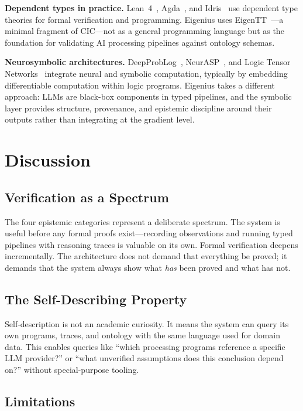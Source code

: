 \documentclass[10pt,twocolumn,letterpaper]{article}
\begin{document}
\textbf{Dependent types in practice.}
Lean~4~\cite{lean4}, Agda~\cite{agda}, and Idris~\cite{idris} use dependent type theories for formal verification and programming.
Eigenius uses EigenTT~\cite{minitt}---a minimal fragment of CIC---not as a general programming language but as the foundation for validating AI processing pipelines against ontology schemas.

\textbf{Neurosymbolic architectures.}
DeepProbLog~\cite{deepproblog}, NeurASP~\cite{neurasp}, and Logic Tensor Networks~\cite{ltn} integrate neural and symbolic computation, typically by embedding differentiable computation within logic programs.
Eigenius takes a different approach: LLMs are black-box components in typed pipelines, and the symbolic layer provides structure, provenance, and epistemic discipline around their outputs rather than integrating at the gradient level.


\section{Discussion}
\label{sec:discussion}

\subsection{Verification as a Spectrum}

The four epistemic categories represent a deliberate spectrum.
The system is useful before any formal proofs exist---recording observations and running typed pipelines with reasoning traces is valuable on its own.
Formal verification deepens incrementally.
The architecture does not demand that everything be proved; it demands that the system always show what \emph{has} been proved and what has not.

\subsection{The Self-Describing Property}

Self-description is not an academic curiosity.
It means the system can query its own programs, traces, and ontology with the same language used for domain data.
This enables queries like ``which processing programs reference a specific LLM provider?'' or ``what unverified assumptions does this conclusion depend on?'' without special-purpose tooling.

\subsection{Limitations}
\end{document}
